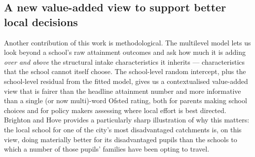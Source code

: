 \documentclass[
  12pt,
  titlepage]{article}
\begin{document}
\subsection{A new value-added view to support better local
decisions}\label{a-new-value-added-view-to-support-better-local-decisions}

Another contribution of this work is methodological. The multilevel
model lets us look beyond a school's raw attainment outcomes and ask how
much it is adding \emph{over and above} the structural intake
characteristics it inherits --- characteristics that the school cannot
itself choose. The school-level random intercept, plus the school-level
residual from the fitted model, gives us a contextualised value-added
view that is fairer than the headline attainment number and more
informative than a single (or now multi)-word Ofsted rating, both for
parents making school choices and for policy makers assessing where
local effort is best directed. Brighton and Hove provides a particularly
sharp illustration of why this matters: the local school for one of the
city's most disadvantaged catchments is, on this view, doing materially
better for its disadvantaged pupils than the schools to which a number
of those pupils' families have been opting to travel.
\end{document}
